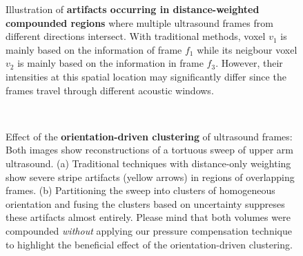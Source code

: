 \begin{figure}[t]
	\centering
	\resizebox{0.75\linewidth}{!}{
		
	}
	\caption{
		Illustration of \textbf{artifacts occurring in distance-weighted compounded regions} where multiple ultrasound frames from different directions intersect.
		With traditional methods, voxel $v_1$ is mainly based on the information of frame $f_1$ while its neigbour voxel $v_2$ is mainly based on the information in frame $f_3$.
			However, their intensities at this spatial location may significantly differ since the frames travel through different acoustic windows.
	}
	\label{fig:uscompounding:different_angles_artifacts}
\end{figure}

\begin{figure}[ht]
	\centering
	\\
	\caption{
		Effect of the \textbf{orientation-driven clustering} of ultrasound frames:
		Both images show reconstructions of a tortuous sweep of upper arm ultrasound.
		(a) Traditional techniques with distance-only weighting show severe stripe artifacts (yellow arrows) in regions of overlapping frames.
		(b) Partitioning the sweep into clusters of homogeneous orientation and fusing the clusters based on uncertainty suppreses these artifacts almost entirely.
		Please mind that both volumes were compounded \emph{without} applying our pressure compensation technique to highlight the beneficial effect of the orientation-driven clustering.
	}
	\label{fig:uscompounding:comparison-clustering}
\end{figure}

